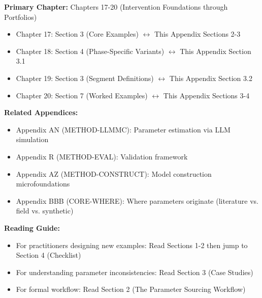 %
%


\begin{tcolorbox}[colback=purple!5!white, colframe=purple!75!black,
    title=Chapter Linkage]

\textbf{Primary Chapter:} Chapters 17-20 (Intervention Foundations through Portfolios)
\begin{itemize}[nosep]
\item Chapter 17: Section 3 (Core Examples) $\leftrightarrow$ This Appendix Sections 2-3
\item Chapter 18: Section 4 (Phase-Specific Variants) $\leftrightarrow$ This Appendix Section 3.1
\item Chapter 19: Section 3 (Segment Definitions) $\leftrightarrow$ This Appendix Section 3.2
\item Chapter 20: Section 7 (Worked Examples) $\leftrightarrow$ This Appendix Sections 3-4
\end{itemize}

\textbf{Related Appendices:}
\begin{itemize}[nosep]
\item Appendix AN (METHOD-LLMMC): Parameter estimation via LLM simulation
\item Appendix R (METHOD-EVAL): Validation framework
\item Appendix AZ (METHOD-CONSTRUCT): Model construction microfoundations
\item Appendix BBB (CORE-WHERE): Where parameters originate (literature vs. field vs. synthetic)
\end{itemize}

\textbf{Reading Guide:}
\begin{itemize}[nosep]
\item For practitioners designing new examples: Read Sections 1-2 then jump to Section 4 (Checklist)
\item For understanding parameter inconsistencies: Read Section 3 (Case Studies)
\item For formal workflow: Read Section 2 (The Parameter Sourcing Workflow)
\end{itemize}

\end{tcolorbox}




